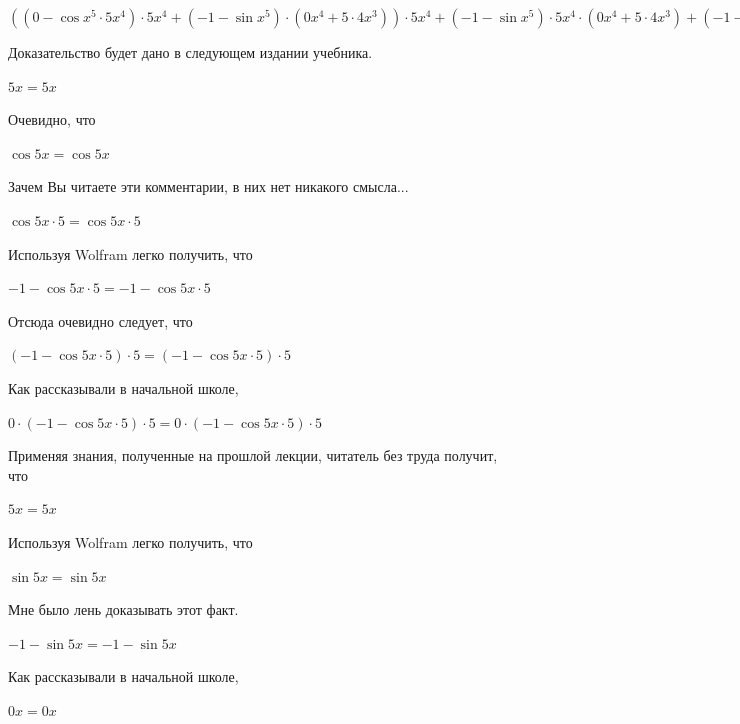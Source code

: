 \documentclass[12pt,a4paper,fleqn]{article}
\theoremstyle{definition}
\begin{document}
$(( 0  - \cos{ x }^{ 5 } \cdot  5 { x }^{ 4 }) \cdot  5 { x }^{ 4 } + ( -1  - \sin{ x }^{ 5 }) \cdot ( 0 { x }^{ 4 } +  5  \cdot  4 { x }^{ 3 })) \cdot  5 { x }^{ 4 } + ( -1  - \sin{ x }^{ 5 }) \cdot  5 { x }^{ 4 } \cdot ( 0 { x }^{ 4 } +  5  \cdot  4 { x }^{ 3 }) + ( -1  - \sin{ x }^{ 5 }) \cdot  5 { x }^{ 4 } \cdot  5  \cdot  4 { x }^{ 3 } + \cos{ x }^{ 5 } \cdot ( 0  \cdot  4 { x }^{ 3 } +  5  \cdot ( 0 { x }^{ 3 } +  4  \cdot  3 { x }^{ 2 })) = (( 0  - \cos{ x }^{ 5 } \cdot  5 { x }^{ 4 }) \cdot  5 { x }^{ 4 } + ( -1  - \sin{ x }^{ 5 }) \cdot ( 0 { x }^{ 4 } +  5  \cdot  4 { x }^{ 3 })) \cdot  5 { x }^{ 4 } + ( -1  - \sin{ x }^{ 5 }) \cdot  5 { x }^{ 4 } \cdot ( 0 { x }^{ 4 } +  5  \cdot  4 { x }^{ 3 }) + ( -1  - \sin{ x }^{ 5 }) \cdot  5 { x }^{ 4 } \cdot  5  \cdot  4 { x }^{ 3 } + \cos{ x }^{ 5 } \cdot ( 0  \cdot  4 { x }^{ 3 } +  5  \cdot ( 0 { x }^{ 3 } +  4  \cdot  3 { x }^{ 2 }))$

Доказательство будет дано в следующем издании учебника. 

$ 5  x  =  5  x $

Очевидно, что 

$\cos 5  x  = \cos 5  x $

Зачем Вы читаете эти комментарии, в них нет никакого смысла... 

$\cos 5  x  \cdot  5  = \cos 5  x  \cdot  5 $

Используя Wolfram легко получить, что 

$ -1  - \cos 5  x  \cdot  5  =  -1  - \cos 5  x  \cdot  5 $

Отсюда очевидно следует, что 

$( -1  - \cos 5  x  \cdot  5 ) \cdot  5  = ( -1  - \cos 5  x  \cdot  5 ) \cdot  5 $

Как рассказывали в начальной школе, 

$ 0  \cdot ( -1  - \cos 5  x  \cdot  5 ) \cdot  5  =  0  \cdot ( -1  - \cos 5  x  \cdot  5 ) \cdot  5 $

Применяя знания, полученные на прошлой лекции, читатель без труда получит, что 

$ 5  x  =  5  x $

Используя Wolfram легко получить, что 

$\sin 5  x  = \sin 5  x $

Мне было лень доказывать этот факт.

$ -1  - \sin 5  x  =  -1  - \sin 5  x $

Как рассказывали в начальной школе, 

$ 0  x  =  0  x $
\end{document}
